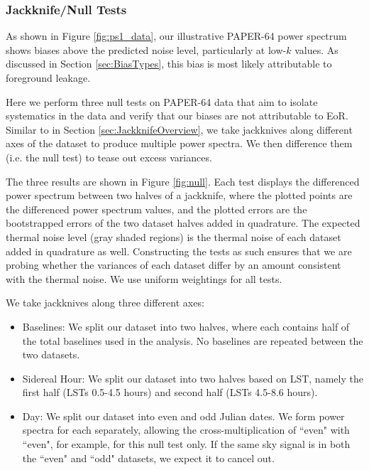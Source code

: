 \documentclass[preprint2,numberedappendix,tighten]{aastex6}  %
\begin{document}
\subsubsection{Jackknife/Null Tests}

As shown in Figure \ref{fig:ps1_data}, our illustrative PAPER-64 power spectrum shows biases above the predicted noise level, particularly at low-$k$ values. As discussed in Section \ref{sec:BiasTypes}, this bias is
most likely attributable to foreground leakage. %

Here we perform three null tests on PAPER-64 data that aim to isolate systematics in the data and verify 
that our biases are not attributable to EoR. Similar to in Section \ref{sec:JackknifeOverview}, we take jackknives along different axes of the dataset to produce multiple power spectra. We then difference them (i.e. the null test) to tease out excess variances.

The three results are shown in Figure \ref{fig:null}. Each test displays the differenced power spectrum between two halves of a jackknife, where the plotted points are the differenced power spectrum values, and the plotted errors are the bootstrapped errors of the two dataset halves added in quadrature. The expected thermal noise level (gray shaded regions) is the thermal noise of each dataset added in quadrature as well. Constructing the tests as such ensures that we are probing whether the variances of each dataset differ by an amount consistent with the thermal noise. We use uniform weightings for all tests. 

We take jackknives along three different axes:

\begin{itemize}
\item Baselines: We split our dataset into two halves, where each contains half of the total baselines used in the 
analysis. No baselines are repeated between the two datasets.
\item Sidereal Hour: We split our dataset into two halves based on LST, namely the first half (LSTs 0.5-4.5 hours) and second half (LSTs 
4.5-8.6 hours).
\item Day: We split our dataset into even and odd Julian dates. We form power spectra for each separately, allowing the cross-multiplication of ``even" with ``even", for example, for this null test only. If the same sky signal is in both the ``even" and ``odd" datasets, we expect it to cancel out. %
\end{itemize}
\end{document}
